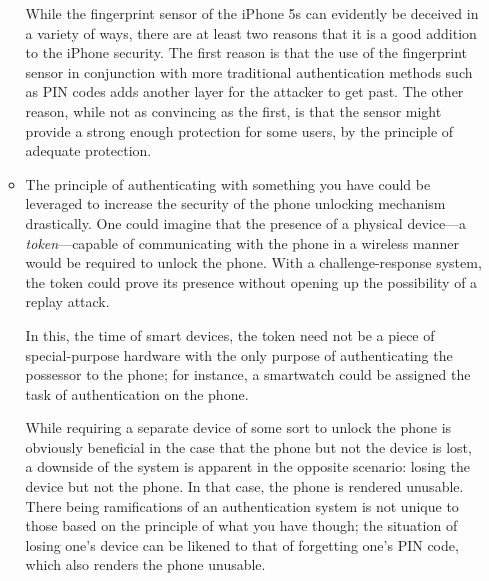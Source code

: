 \begin{enumerate}
\begin{itemize}
      While the fingerprint sensor of the iPhone 5s can evidently be deceived in a variety of ways, there are at least two reasons that it is a good addition to the iPhone security. The first reason is that the use of the fingerprint sensor in conjunction with more traditional authentication methods such as PIN codes adds another layer for the attacker to get past. The other reason, while not as convincing as the first, is that the sensor might provide a strong enough protection for some users, by the principle of adequate protection.
    \item

      The principle of authenticating with something you have could be leveraged to increase the security of the phone unlocking mechanism drastically. One could imagine that the presence of a physical device---a \textit{token}---capable of communicating with the phone in a wireless manner would be required to unlock the phone. With a challenge-response system, the token could prove its presence without opening up the possibility of a replay attack.

In this, the time of smart devices, the token need not be a piece of special-purpose hardware with the only purpose of authenticating the possessor to the phone; for instance, a smartwatch could be assigned the task of authentication on the phone.

While requiring a separate device of some sort to unlock the phone is obviously beneficial in the case that the phone but not the device is lost, a downside of the system is apparent in the opposite scenario: losing the device but not the phone. In that case, the phone is rendered unusable. There being ramifications of an authentication system is not unique to those based on the principle of what you have though; the situation of losing one's device can be likened to that of forgetting  one's PIN code, which also renders the phone unusable.
  \end{itemize}
\end{enumerate}
